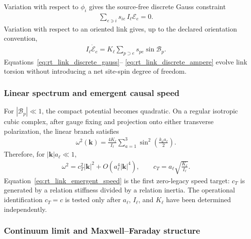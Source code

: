 Variation with respect to $\phi_i$ gives the source-free discrete Gauss
constraint
\begin{align}
    \sum_{e\ni i}s_{ie}\,I_\ell\mathscr E_e=0.
    \label{eq:rt_link_discrete_gauss}
\end{align}
Variation with respect to an oriented link gives, up to the declared orientation
convention,
\begin{align}
    I_\ell\dot{\mathscr E}_e
    =
    K_\ell
    \sum_{p\supset e}s_{pe}\sin\mathscr B_p.
    \label{eq:rt_link_discrete_ampere}
\end{align}
Equations~\eqref{eq:rt_link_discrete_gauss}--
\eqref{eq:rt_link_discrete_ampere} evolve link torsion without introducing a
net site-spin degree of freedom.

\subsubsection{Linear spectrum and emergent causal speed}

For $|\mathscr B_p|\ll1$, the compact potential becomes quadratic.  On a
regular isotropic cubic complex, after gauge fixing and projection onto either
transverse polarization, the linear branch satisfies
\begin{align}
    \omega^2(\mathbf k)
    =
    \frac{4K_\ell}{I_\ell}
    \sum_{a=1}^{3}
    \sin^2\!\left(\frac{k_a a_\ell}{2}\right).
    \label{eq:rt_link_lattice_dispersion}
\end{align}
Therefore, for $|\mathbf k|a_\ell\ll1$,
\begin{align}
    \omega^2
    =
    c_T^2|\mathbf k|^2
    +O\!\left(a_\ell^4|\mathbf k|^4\right),
    \qquad
    \boxed{
    c_T=a_\ell\sqrt{\frac{K_\ell}{I_\ell}}
    }.
    \label{eq:rt_link_emergent_speed}
\end{align}
Equation~\eqref{eq:rt_link_emergent_speed} is the first zero-legacy speed target:
$c_T$ is generated by a relation stiffness divided by a relation inertia.  The
operational identification $c_T=c$ is tested only after $a_\ell$, $I_\ell$, and
$K_\ell$ have been determined independently.

\subsubsection{Continuum limit and Maxwell--Faraday structure}

